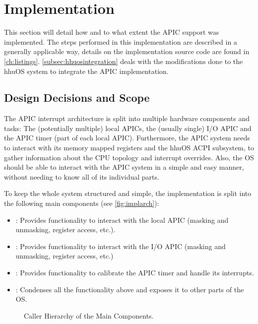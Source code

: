 \chapter{Implementation}
\label{ch:implementation}

This section will detail how and to what extent the APIC support was implemented.
The steps performed in this implementation are described in a generally applicable way, details on the implementation source code are found in \autoref{ch:listings}.
\autoref{subsec:hhuosintegration} deals with the modifications done to the hhuOS system to integrate the APIC implementation.

\clearpage

\section{Design Decisions and Scope}
\label{sec:design}

The APIC interrupt architecture is split into multiple hardware components and tasks: The (potentially multiple) local APICs, the (usually single) I/O APIC and the APIC timer (part of each local APIC).
Furthermore, the APIC system needs to interact with its memory mapped registers and the hhuOS ACPI subsystem, to gather information about the CPU topology and interrupt overrides.
Also, the OS should be able to interact with the APIC system in a simple and easy manner, without needing to know all of its individual parts.

To keep the whole system structured and simple, the implementation is split into the following main components (see \autoref{fig:implarch}):

\begin{itemize}
  \item {}: Provides functionality to interact with the local APIC (masking and unmasking, register access, etc.).
  \item {}: Provides functionality to interact with the I/O APIC (masking and unmasking, register access, etc.)
  \item {}: Provides functionality to calibrate the APIC timer and handle its interrupts.
  \item {}: Condenses all the functionality above and exposes it to other parts of the OS\@.
\end{itemize}

\begin{figure}[h]
  \centering
  \begin{subfigure}[b]{0.5\textwidth}
    
  \end{subfigure}
  \caption{Caller Hierarchy of the Main Components.}
  \label{fig:implarch}
\end{figure}

